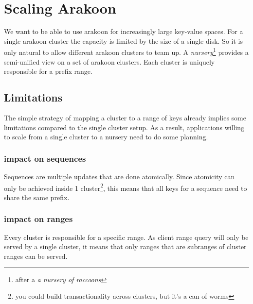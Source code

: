 \section{Scaling Arakoon}
We want to be able to use arakoon for increasingly large key-value spaces. 
For a single arakoon cluster the capacity is limited by the size of a single disk. 
So it is only natural to allow different arakoon clusters to team up. 
A \emph{nursery}\footnote{after a \emph{a nursery of raccoons}} provides a semi-unified view on a set of arakoon clusters. 
Each cluster is uniquely responsible for a prefix range. 
\subsection{Limitations}
The simple strategy of mapping a cluster to a range of keys already implies some limitations compared to the single cluster setup. 
As a result, applications willing to scale from a single cluster to a nursery need to do some planning.
\subsubsection{impact on sequences}
Sequences are multiple updates that are done atomically. 
Since atomicity can only be achieved inside 1 cluster\footnote{you could build transactionality across clusters, but it's a can of worms}, this means that all keys for a sequence need to share the same prefix. 
\subsubsection{impact on ranges}
Every cluster is responsible for a specific range. 
As client range query will only be served by a single cluster, it means that only ranges that are subranges of cluster ranges can be served.
